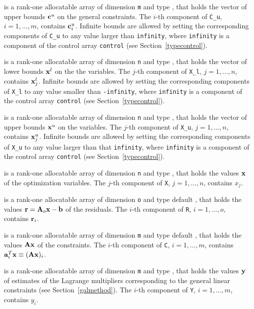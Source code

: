 \documentclass{galahad}
\begin{document}
\begin{description}
 is a rank-one allocatable array of dimension {\tt m} and type
\realdp, that holds the vector of upper bounds ${\mathbf{c}}^{u}$
on the general constraints. The $i$-th component of
{\tt C\_u}, $i = 1,  \ldots ,  m$, contains ${\mathbf{c}}_{i}^{u}$.
Infinite bounds are allowed by setting the corresponding
components of {\tt C\_u} to any value larger than {\tt infinity},
where {\tt infinity} is a component of the control array {\tt control}
(see Section~\ref{typecontrol}).

 is a rank-one allocatable array of dimension {\tt n} and type
\realdp, that holds
the vector of lower bounds ${\mathbf{x}}^{l}$ on the the variables.
The $j$-th component of {\tt X\_l}, $j = 1, \ldots , n$,
contains ${\mathbf{x}}_{j}^{l}$.
Infinite bounds are allowed by setting the corresponding
components of {\tt X\_l} to any value smaller than {\tt -infinity},
where {\tt infinity} is a component of the control array {\tt control}
(see Section~\ref{typecontrol}).

 is a rank-one allocatable array of dimension {\tt n} and type
\realdp, that holds
the vector of upper bounds ${\mathbf{x}}^{u}$ on the variables.
The $j$-th component of {\tt X\_u}, $j = 1, \ldots , n$,
contains ${\mathbf{x}}_{j}^{u}$.
Infinite bounds are allowed by setting the corresponding
components of {\tt X\_u} to any value larger than that {\tt infinity},
where {\tt infinity} is a component of the control array {\tt control}
(see Section~\ref{typecontrol}).

 is a rank-one allocatable array of dimension {\tt n} and type
\realdp,
that holds the values ${\mathbf{x}}$ of the optimization variables.
The $j$-th component of {\tt X}, $j = 1,  \ldots , n$, contains $x_{j}$.

 is a rank-one allocatable array of dimension {\tt o} and type default
\realdp, that holds the values ${\mathbf{r}} = {\mathbf{A}}_o {\mathbf{x}} - {\mathbf{b}}$ of the residuals.
The $i$-th component of {\tt R}, $i = 1,  \ldots , o$, contains ${\mathbf{r}}_{i}$.

 is a rank-one allocatable array of dimension {\tt m} and type default
\realdp, that holds
the values ${\mathbf{A}} {\mathbf{x}}$ of the constraints.
The $i$-th component of {\tt C}, $i = 1,  \ldots ,  m$, contains
${\mathbf{a}}_{i}^{T}{\mathbf{x}} \equiv ({\mathbf{A}} {\mathbf{x}})_{i}$.

 is a rank-one allocatable array of dimension {\tt m} and type
\realdp, that holds
the values ${\mathbf{y}}$ of estimates  of the Lagrange multipliers
corresponding to the general linear constraints (see Section~\ref{galmethod}).
The $i$-th component of {\tt Y}, $i = 1,  \ldots ,  m$, contains $y_{i}$.


\end{description}
\end{document}
